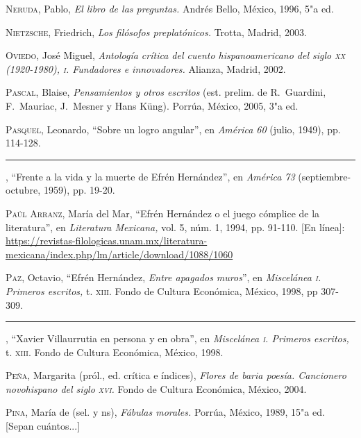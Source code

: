 \documentclass[14pt,twoside,final]{extbook} %
\begin{document}
\textsc{Neruda}, Pablo, \emph{El libro de las preguntas.} Andrés Bello, México, 1996, 5"a ed.\label{bib:neruda1996}

\textsc{Nietzsche}, Friedrich, \emph{Los filósofos preplatónicos.} Trotta, Madrid, 2003.\label{bib:nietzche2003}

\textsc{Oviedo}, José Miguel, \emph{Antología crítica del cuento hispanoamericano del siglo \textsc{xx} (1920-1980), \textsc{i}. Fundadores e innovadores.} Alianza, Madrid, 2002.\label{bib:oviedo2002}

\textsc{Pascal}, Blaise, \emph{Pensamientos y otros escritos} (est. prelim. de R.~Guardini, F.~Mauriac, J.~Mesner y Hans Küng). Porrúa, México, 2005, 3"a ed.

\textsc{Pasquel}, Leonardo, ``Sobre un logro angular'', en \emph{América 60} (julio, 1949), pp. 114-128.\label{bib:pasquel1949}

\rule{1cm}{0.4pt}, ``Frente a la vida y la muerte de Efrén Hernández'', en \emph{América 73} (septiembre-octubre, 1959), pp. 19-20.\label{bib:pasquel1959}

\textsc{Paúl Arranz}, María del Mar, ``Efrén Hernández o el juego cómplice de la literatura'', en \emph{Literatura Mexicana,} vol. 5, núm. 1, 1994, pp. 91-110. [En línea]: \url{https://revistas-filologicas.unam.mx/literatura-mexicana/index.php/lm/article/download/1088/1060}\label{bib:paul1994}

\textsc{Paz}, Octavio, ``Efrén Hernández, \emph{Entre apagados muros}'', en \emph{Miscelánea \textsc{i}. Primeros escritos,} t. \textsc{xiii}. Fondo de Cultura Económica, México, 1998, pp 307-309.\label{bib:paz1998a}

\rule{1cm}{0.4pt}, ``Xavier Villaurrutia en persona y en obra'', en \emph{Miscelánea \textsc{i}. Primeros escritos,} t. \textsc{xiii}. Fondo de Cultura Económica, México, 1998.\label{bib:paz1998b}

\textsc{Peña}, Margarita (pról., ed. crítica e índices), \emph{Flores de baria poesía. Cancionero novohispano del siglo \textsc{xvi}.} Fondo de Cultura Económica, México, 2004.\label{bib:peña2004}

\textsc{Pina}, María de (sel. y ns), \emph{Fábulas morales.} Porrúa, México, 1989, 15"a ed. [Sepan cuántos...]\label{bib:pina1989}
\end{document}
